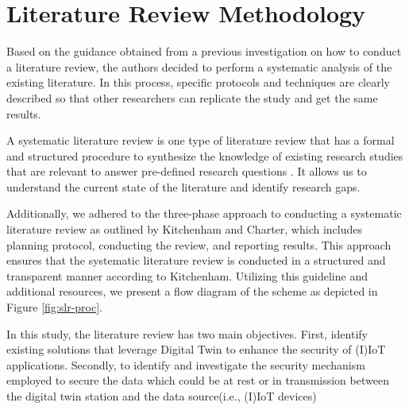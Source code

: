 \chapter{Literature Review Methodology} %

\label{Chapter2} %

Based on the guidance obtained from a previous investigation on how to conduct a literature review, the authors decided to perform a systematic analysis of the existing literature. In this process, specific protocols and techniques are clearly described so that other researchers can replicate the study and get the same results. 


A systematic literature review is one type of literature review that has a formal and structured procedure to synthesize the knowledge of existing research studies that are relevant to answer pre-defined research questions \cite{kofod-petersen_how_nodate, kitchenham_guidelines_2007}. It allows us to understand the current state of the literature and identify research gaps\cite{carrera-rivera_how-conduct_2022}. 

Additionally, we adhered to the three-phase approach to conducting a systematic literature review as outlined by Kitchenham and Charter\cite{kitchenham_guidelines_2007}, which includes planning protocol, conducting the review, and reporting results. This approach ensures that the systematic literature review is conducted in a structured and transparent manner according to Kitchenham\cite{kitchenham_guidelines_2007}. Utilizing this guideline and additional resources, we present a flow diagram of the scheme as depicted in Figure \ref{fig:slr-proc}. 

In this study, the literature review has two main objectives. First, identify existing solutions that leverage Digital Twin to enhance the security of (I)IoT applications. Secondly, to identify and investigate the security mechanism employed to secure the data which could be at rest or in transmission between the digital twin station and the data source(i.e., (I)IoT devices)


